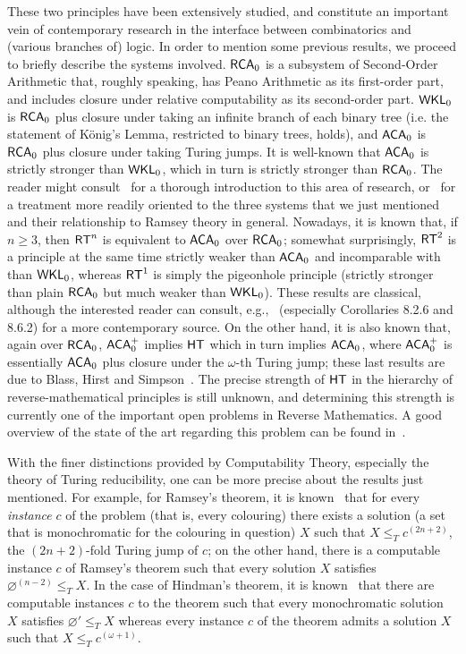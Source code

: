\documentclass[11pt]{amsart}
\newcommand{\rt}{\mathnormal{\mathsf{RT}}}
\newcommand{\hind}{\mathnormal{\mathsf{HT}}}
\newcommand{\rca}{\mathnormal{\mathsf{RCA}}_0}
\newcommand{\aca}{\mathnormal{\mathsf{ACA}}_0}
\newcommand{\wkl}{\mathnormal{\mathsf{WKL}}_0}
\newcommand{\acaplus}{\mathnormal{\mathsf{ACA}}_0^+}
\theoremstyle{definition}
\begin{document}
These two principles have been extensively studied, and constitute an important vein of contemporary research in the interface between combinatorics and (various branches of) logic. In order to mention some previous results, we proceed to briefly describe the systems involved. $\rca$ is a subsystem of Second-Order Arithmetic that, roughly speaking, has Peano Arithmetic as its first-order part, and includes closure under relative computability as its second-order part. $\wkl$ is $\rca$ plus closure under taking an infinite branch of each binary tree (i.e. the statement of K\"onig's Lemma, restricted to binary trees, holds), and $\aca$ is $\rca$ plus closure under taking Turing jumps. It is well-known that $\aca$ is strictly stronger than $\wkl$, which in turn is strictly stronger than $\rca$. The reader might consult~\cite{simpson-subsystems} for a thorough introduction to this area of research, or~\cite{hirschfeldt} for a treatment more readily oriented to the three systems that we just mentioned and their relationship to Ramsey theory in general. Nowadays, it is known that, if $n\geq 3$, then $\rt^n$ is equivalent to $\aca$ over $\rca$; somewhat surprisingly, $\rt^2$ is a principle at the same time strictly weaker than $\aca$ and incomparable with than $\wkl$, whereas $\rt^1$ is simply the pigeonhole principle (strictly stronger than plain $\rca$ but much weaker than $\wkl$). These results are classical, although the interested reader can consult, e.g.,~\cite{dzhafarov-mummert-textbook} (especially Corollaries 8.2.6 and 8.6.2) for a more contemporary source. On the other hand, it is also known that, again over $\rca$, $\acaplus$ implies $\hind$ which in turn implies $\aca$, where $\acaplus$ is essentially $\aca$ plus closure under the $\omega$-th Turing jump; these last results are due to Blass, Hirst and Simpson~\cite{blass-hirst-simpson}. The precise strength of $\hind$ in the hierarchy of reverse-mathematical principles is still unknown, and determining this strength is currently one of the important open problems in Reverse Mathematics. A good overview of the state of the art regarding this problem can be found in~\cite{carlucci-overview}.

With the finer distinctions provided by Computability Theory, especially the theory of Turing reducibility, one can be more precise about the results just mentioned. For example, for Ramsey's theorem, it is known~\cite{jockusch} that for every {\it instance} $c$ of the problem (that is, every colouring) there exists a solution (a set that is monochromatic for the colouring in question) $X$ such that $X\leq_T c^{(2n+2)}$, the $(2n+2)$-fold Turing jump of $c$; on the other hand, there is a computable instance $c$ of Ramsey's theorem such that every solution $X$ satisfies $\varnothing^{(n-2)}\leq_T X$. In the case of Hindman's theorem, it is known~\cite{blass-hirst-simpson} that there are computable instances $c$ to the theorem such that every monochromatic solution $X$ satisfies $\varnothing'\leq_T X$ whereas every instance $c$ of the theorem admits a solution $X$ such that $X\leq_T c^{(\omega+1)}$.
\end{document}
